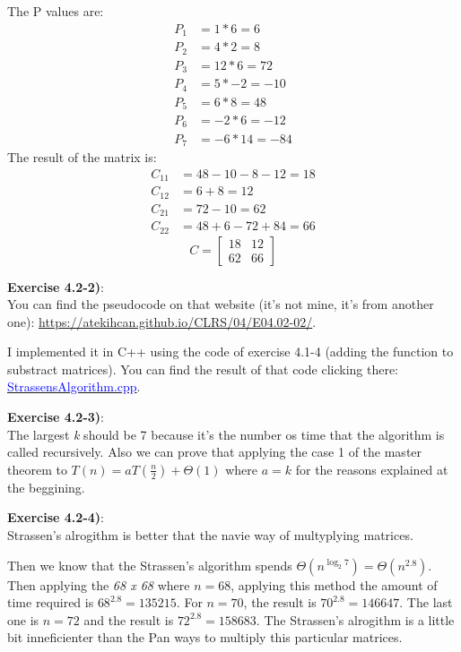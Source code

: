 \documentclass{article}
\newcounter{exercise}[section]   %
\begin{document}
The P values are:
\begin{align*}
    P_1 &= 1 * 6 = 6 \\ P_2 &= 4 * 2 = 8 \\ P_3 &= 12 * 6 = 72 \\ P_4 &= 5 * -2 = -10 \\
    P_5 &= 6 * 8 = 48 \\ P_6 &= -2 * 6 = -12 \\ P_7 &= -6 * 14 = -84
\end{align*}
\newpage
The result of the matrix is:
\begin{align*}
    C_{11} &= 48 - 10 - 8 - 12 = 18 \\ C_{12} &= 6 + 8 = 12 \\
    C_{21} &= 72 - 10 = 62 \\ C_{22} &= 48 + 6 -72 + 84 = 66
\end{align*}
\[
C =
\begin{bmatrix}
    18 & 12 \\
    62 & 66
\end{bmatrix}
\]

\textbf{Exercise 4.2-2)}:\\
You can find the pseudocode on that website (it's not mine, it's from another one):
\href{https://atekihcan.github.io/CLRS/04/E04.02-02/}{https://atekihcan.github.io/CLRS/04/E04.02-02/}.

I implemented it in C++ using the code of exercise 4.1-4 (adding the function to substract matrices).
You can find the result of that code clicking there: \href{https://github.com/Graburr/Algorithms_CLRS_4ed_solutions/blob/main/chapter1/Divide_%26_Conquer/StrassensAlgorithm.cpp}
{\textcolor{Blue}{StrassensAlgorithm.cpp}}.

\textbf{Exercise 4.2-3)}:\\
The largest \textit{k} should be 7 because it's the number os time that the algorithm is 
called recursively. Also we can prove that applying the case 1 of the master theorem to 
\(T(n) = aT\left(\frac{n}{2}\right) + \Theta(1)\) where \(a = k\) for the reasons explained 
at the beggining.

\textbf{Exercise 4.2-4)}:\\
Strassen's alrogithm is better that the navie way of multyplying matrices.

Then we know that the Strassen's algorithm spends \(\Theta(n^{\log_2 7}) = \Theta
(n^{2.8})\). Then applying the \textit{68 x 68} where \(n = 68\), applying this method the
amount of time required is \(68^{2.8} = 135215\). For \(n = 70\), the result is \(70^{2.8}
 = 146647\). The last one is \(n = 72\) and the result is \(72^{2.8} = 158683\). The Strassen's
alrogithm is a little bit inneficienter than the Pan ways to multiply this particular
matrices. 
\end{document}
